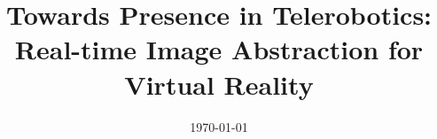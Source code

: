 \documentclass[a4paper, 12pt, twoside]{Thesis}  %
\begin{document}
\frontmatter      %

\title  {Towards Presence in Telerobotics: Real-time Image Abstraction for Virtual Reality}

\addresses  {\groupname\\\deptname\\\univname}  %
\date       {\today}
\subject    {}
\keywords   {}

\maketitle


\fancyhead{}  %
\rhead{\thepage}  %
\lhead{}  %

\pagestyle{fancy}  %


\end{document}
